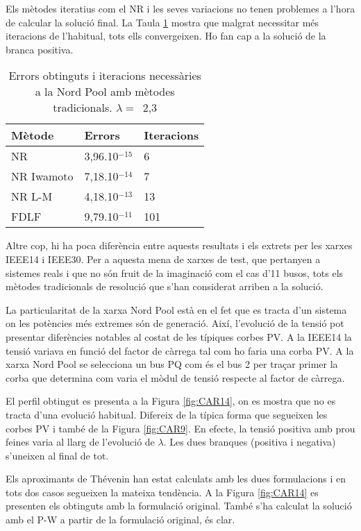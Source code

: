 Els mètodes iteratius com el NR i les seves variacions no tenen problemes a l'hora de calcular la solució final. La Taula \ref{tab:CAR13} mostra que malgrat necessitar més iteracions de l'habitual, tots ells convergeixen. Ho fan cap a la solució de la branca positiva. 

\begin{table}[!htb]
  \begin{center}
  \begin{tabular}{lll}
  \hline
  Mètode & Errors & Iteracions\\
  \hline
  \hline
  NR & 3,96.10$^{-15}$ & 6\\ 
  NR Iwamoto & 7,18.10$^{-14}$ & 7\\
  NR L-M & 4,18.10$^{-13}$ & 13\\ 
  FDLF & 9,79.10$^{-11}$ & 101\\
  \hline 
  \end{tabular}
  \caption{Errors obtinguts i iteracions necessàries a la Nord Pool amb mètodes tradicionals. $\lambda=$\ 2,3}
  \label{tab:CAR13}
  \end{center}
\end{table}

Altre cop, hi ha poca diferència entre aquests resultats i els extrets per les xarxes IEEE14 i IEEE30. Per a aquesta mena de xarxes de test, que pertanyen a sistemes reals i que no són fruit de la imaginació com el cas d'11 busos, tots els mètodes tradicionals de resolució que s'han considerat arriben a la solució. 

La particularitat de la xarxa Nord Pool està en el fet que es tracta d'un sistema on les potències més extremes són de generació. Així, l'evolució de la tensió pot presentar diferències notables al costat de les típiques corbes PV. A la IEEE14 la tensió variava en funció del factor de càrrega tal com ho faria una corba PV. A la xarxa Nord Pool se selecciona un bus PQ com és el bus 2 per traçar primer la corba que determina com varia el mòdul de tensió respecte al factor de càrrega.

El perfil obtingut es presenta a la Figura \ref{fig:CAR14}, on es mostra que no es tracta d'una evolució habitual. Difereix de la típica forma que segueixen les corbes PV i també de la Figura \ref{fig:CAR9}. En efecte, la tensió positiva amb prou feines varia al llarg de l'evolució de $\lambda$. Les dues branques (positiva i negativa) s'uneixen al final de tot. 

Els aproximants de Thévenin han estat calculats amb les dues formulacions i en tots dos casos segueixen la mateixa tendència. A la Figura \ref{fig:CAR14} es presenten els obtinguts amb la formulació original. També s'ha calculat la solució amb el P-W a partir de la formulació original, és clar.

